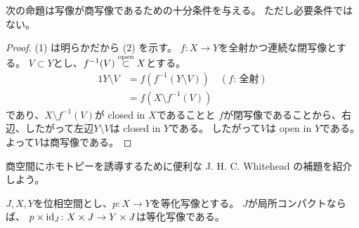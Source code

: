 \documentclass[report]{jlreq}
\begin{document}
次の命題は写像が商写像であるための十分条件を与える。
ただし必要条件ではない。


\begin{proof}
    (1) は明らかだから (2) を示す。
    $f \colon X \to Y$を全射かつ連続な閉写像とする。
    $V \subset Y$とし、$f^{-1}(V) \stackrel{\text{open}}{\subset} X$とする。
    \begin{alignat}{1}
        Y \setminus V
            &= f(f^{-1}(Y \setminus V)) \quad (\text{$f$: 全射}) \\
            &= f(X \setminus f^{-1}(V))
    \end{alignat}
    であり、$X \setminus f^{-1}(V)$が closed in $X$であることと
    $f$が閉写像であることから、右辺、したがって左辺$Y \setminus V$は closed in $Y$である。
    したがって$V$は open in $Y$である。
    よって$V$は商写像である。
\end{proof}

商空間にホモトピーを誘導するために便利な
J. H. C. Whitehead の補題を紹介しよう。

\begin{theorem}
    $J, X, Y$を位相空間とし、$p \colon X \to Y$を等化写像とする。
    $J$が局所コンパクトならば、
    $p \times \mathrm{id}_J \colon X \times J \to Y \times J$は等化写像である。
\end{theorem}
\end{document}
